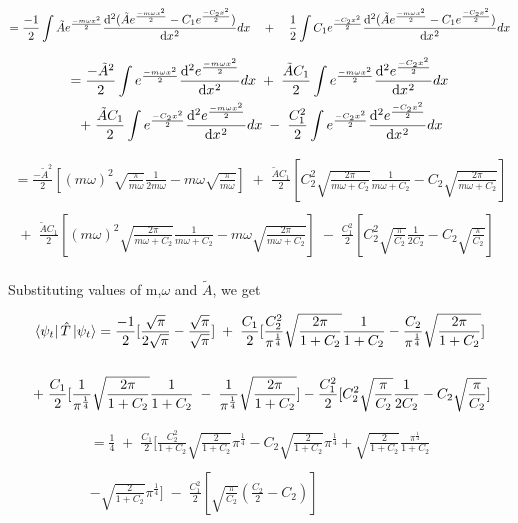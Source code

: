 \documentclass[12pt]{article}
\begin{document}
\[ = \frac{-1}{2} \int \tilde{A}e^{\frac{-m \omega x^2}{2}} \diff[2]{(\tilde{A}e^{\frac{-m \omega x^2}{2}} - C_1e^{\frac{-C_2 x^2}{2}})}{x} dx \quad + \quad \frac{1}{2} \int C_1e^{\frac{-C_2 x^2}{2}} \diff[2]{(\tilde{A}e^{\frac{-m \omega x^2}{2}} - C_1e^{\frac{-C_2 x^2}{2}})}{x} dx \]

\begin{multline*}   
= \frac{-\tilde{A}^2}{2} \int e^{\frac{-m \omega x^2}{2}} \diff[2]{e^{\frac{-m \omega x^2}{2}}}{x} dx \;+\;  \frac{\tilde{A}C_1}{2} \int e^{\frac{-m \omega x^2}{2}} \diff[2]{e^{\frac{-C_2 x^2}{2}}}{x} dx \\
\;+\; \frac{\tilde{A}C_1}{2} \int e^{\frac{-C_2 x^2}{2}} \diff[2]{e^{\frac{-m \omega x^2}{2}}}{x} dx \;-\; \frac{C_1^2}{2} \int e^{\frac{-C_2 x^2}{2}} \diff[2]{e^{\frac{-C_2 x^2}{2}}}{x} dx 
\end{multline*} 

\newpage
\begin{multline*}
= \frac{- \tilde{A}^2}{2}[(m\omega)^2 \sqrt{\frac{\pi}{m \omega}} \frac{1}{2 m \omega} - m\omega \sqrt{\frac{\pi}{m \omega}}] \;+\; \frac{\tilde{A}C_1}{2} [C_2^2 \sqrt{\frac{2 \pi}{m \omega + C_2}} \frac{1}{m \omega + C_2} - C_2 \sqrt{\frac{2 \pi}{m \omega + C_2}}] \\
\\
\;+\; \frac{\tilde{A}C_1}{2} [(m \omega)^2 \sqrt{\frac{2 \pi}{m \omega + C_2}} \frac{1}{m \omega + C_2} - m \omega \sqrt{\frac{2 \pi}{m \omega + C_2}}] \;-\; \frac{C_1^2}{2} [C_2^2 \sqrt{\frac{\pi}{C_2}} \frac{1}{2 C_2} - C_2 \sqrt{\frac{\pi}{C_2}}]
\end{multline*}
\\
Substituting values of m,$\omega$ and $\tilde{A}$, we get 

\begin{multline*}
\bra{\psi_t}\hat{T}\ket{\psi_t} = \frac{-1}{2} [\frac{\sqrt{\pi}}{2 \sqrt{\pi}} - \frac{\sqrt{\pi}}{\sqrt{\pi}}] \;+\; \frac{C_1}{2} [\frac{C_2^2}{\pi^\frac{1}{4}} \sqrt{\frac{2\pi}{1 + C_2}}\frac{1}{1 + C_2} - \frac{C_2}{\pi^\frac{1}{4}}\sqrt{\frac{2\pi}{1+C_2}}] \\
\\
\;+\; \frac{C_1}{2} [\frac{1}{\pi^\frac{1}{4}} \sqrt{\frac{2\pi}{1 + C_2}}\frac{1}{1 + C_2} \;-\; \frac{1}{\pi^\frac{1}{4}}\sqrt{\frac{2\pi}{1+C_2}}] - \frac{C_1^2}{2} [C_2^2 \sqrt{\frac{\pi}{C_2}}\frac{1}{2C_2} - C_2 \sqrt{\frac{\pi}{C_2}}]
\end{multline*}

\begin{multline*}
= \frac{1}{4} \;+\; \frac{C_1}{2} [\frac{C_2^2}{1 + C_2}\sqrt{\frac{2}{1 + C_2}} \pi^\frac{1}{4} - C_2 \sqrt{\frac{2}{1 + C_2}} \pi^\frac{1}{4} + \sqrt{\frac{2}{1 + C_2}} \frac{\pi ^ \frac{1}{4}}{1 + C_2} \\
\\
- \sqrt{\frac{2}{1 + C_2}}\pi^\frac{1}{4}] 
\;-\; \frac{C_1^2}{2} [\sqrt{\frac{\pi}{C_2}} (\frac{C_2}{2} - C_2)] 
\end{multline*}
\end{document}
